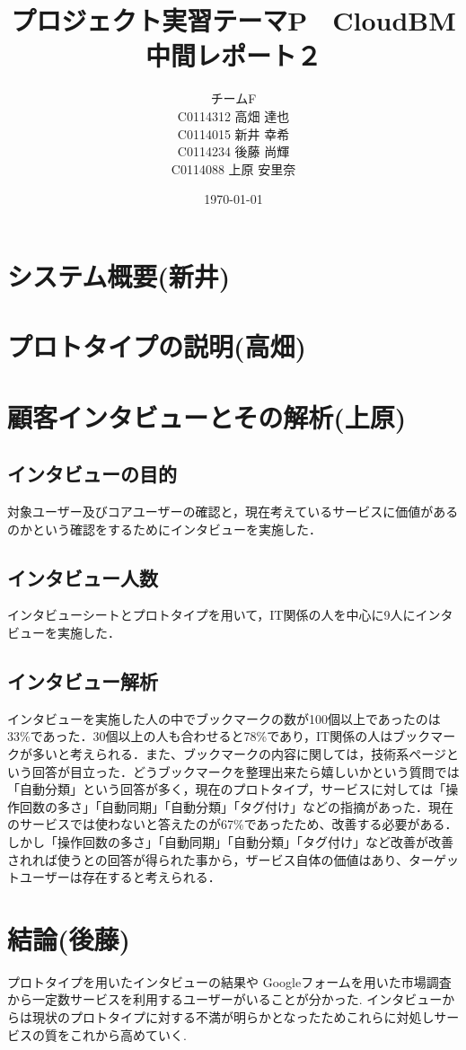 \documentclass[a4paper,10pt,fleqn]{jsarticle}
\title{プロジェクト実習テーマP　CloudBM  中間レポート２}
\author{
  チームF　\\
  C0114312 高畑 達也\\
  C0114015 新井 幸希\\
  C0114234 後藤 尚輝\\
  C0114088 上原 安里奈\\
}
\date{\today}
\begin{document}
\maketitle

\section{システム概要(新井)}

\section{プロトタイプの説明(高畑)}

\section{顧客インタビューとその解析(上原)}

\subsection{インタビューの目的}
対象ユーザー及びコアユーザーの確認と，現在考えているサービスに価値があるのかという確認をするためにインタビューを実施した．

\subsection{インタビュー人数}
インタビューシートとプロトタイプを用いて，IT関係の人を中心に9人にインタビューを実施した．

\subsection{インタビュー解析}
インタビューを実施した人の中でブックマークの数が100個以上であったのは33\%であった．30個以上の人も合わせると78\%であり，IT関係の人はブックマークが多いと考えられる．また、ブックマークの内容に関しては，技術系ページという回答が目立った．どうブックマークを整理出来たら嬉しいかという質問では「自動分類」という回答が多く，現在のプロトタイプ，サービスに対しては「操作回数の多さ」「自動同期」「自動分類」「タグ付け」などの指摘があった．現在のサービスでは使わないと答えたのが67\%であったため、改善する必要がある．しかし「操作回数の多さ」「自動同期」「自動分類」「タグ付け」など改善が改善されれば使うとの回答が得られた事から，ザービス自体の価値はあり、ターゲットユーザーは存在すると考えられる．

\section{結論(後藤)}
プロトタイプを用いたインタビューの結果や
Googleフォームを用いた市場調査から一定数サービスを利用するユーザーがいることが分かった.
インタビューからは現状のプロトタイプに対する不満が明らかとなったためこれらに対処しサービスの質をこれから高めていく.
\end{document}
